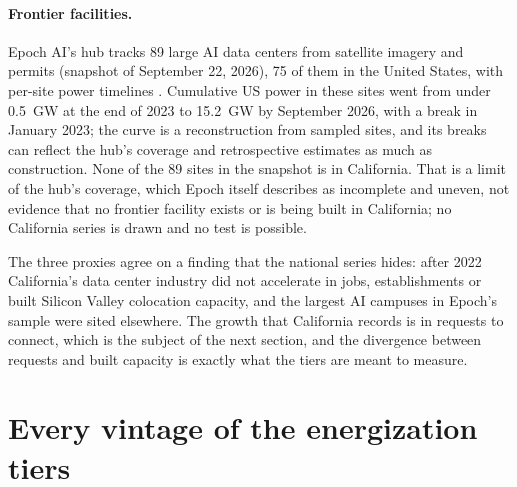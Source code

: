 \paragraph{Frontier facilities.} Epoch AI's hub tracks 89 large AI data centers from satellite imagery and permits (snapshot of September 22, 2026), 75 of them in the United States, with per-site power timelines \citep{epoch_timelines}. Cumulative US power in these sites went from under 0.5~GW at the end of 2023 to 15.2~GW by September 2026, with a break in January 2023; the curve is a reconstruction from sampled sites, and its breaks can reflect the hub's coverage and retrospective estimates as much as construction. None of the 89 sites in the snapshot is in California. That is a limit of the hub's coverage, which Epoch itself describes as incomplete and uneven, not evidence that no frontier facility exists or is being built in California; no California series is drawn and no test is possible.

The three proxies agree on a finding that the national series hides: after 2022 California's data center industry did not accelerate in jobs, establishments or built Silicon Valley colocation capacity, and the largest AI campuses in Epoch's sample were sited elsewhere. The growth that California records is in requests to connect, which is the subject of the next section, and the divergence between requests and built capacity is exactly what the tiers are meant to measure.

\section{Every vintage of the energization tiers}
\label{sec:vintages}

